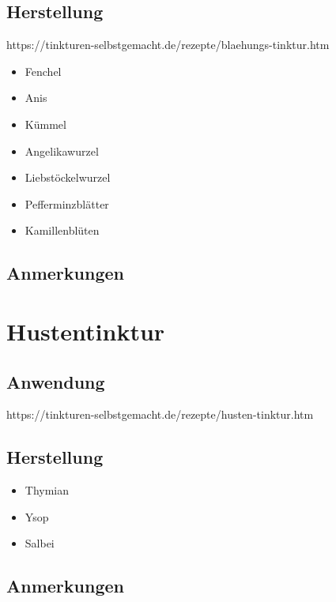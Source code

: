 \subsection{Herstellung}

https://tinkturen-selbstgemacht.de/rezepte/blaehungs-tinktur.htm


\begin{itemize}
	\item Fenchel
	\item Anis
	\item Kümmel
	\item Angelikawurzel
	\item Liebstöckelwurzel
	\item Pefferminzblätter
	\item Kamillenblüten
\end{itemize}

\subsection{Anmerkungen}




\section{Hustentinktur}

\subsection{Anwendung}

https://tinkturen-selbstgemacht.de/rezepte/husten-tinktur.htm

\subsection{Herstellung}


\begin{itemize}
	\item Thymian
	\item Ysop
	\item Salbei
\end{itemize}

\subsection{Anmerkungen}